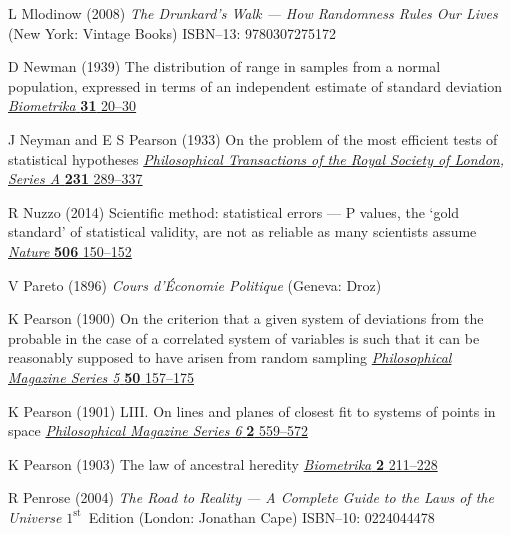 \begin{thebibliography}{99}
L Mlodinow
(2008) \textit{The Drunkard's Walk --- How Randomness Rules Our 
Lives}
(New York: Vintage Books)
ISBN--13: 9780307275172

D Newman
(1939) The distribution of range in samples from a normal 
population, expressed in terms of an independent estimate of 
standard deviation
\href{http://dx.doi.org/10.1093/biomet/31.1-2.20}{\textit{Biometrika}
\textbf{31} 20--30}

J Neyman and E S Pearson
(1933) On the problem of the most efficient tests of statistical 
hypotheses
\href{http://dx.doi.org/10.1098/rsta.1933.0009}{\textit{Philosophical Transactions of the Royal Society of London, 
Series A} \textbf{231} 289--337}

R Nuzzo
(2014) Scientific method: statistical errors --- P values, the 
`gold standard' of statistical validity, are not as reliable as 
many scientists assume
\href{https://doi.org/10.1038/506150a}{\textit{Nature} \textbf{506} 
150--152}

V Pareto
(1896) \textit{Cours d'\'{E}conomie Politique} (Geneva: Droz)

K Pearson
(1900) On the criterion that a given system of deviations from the 
probable in the case of a correlated system of variables is such 
that it can be reasonably supposed to have arisen from random 
sampling
\href{http://dx.doi.org/10.1080/14786440009463897}{\textit{Philosophical Magazine Series 5} \textbf{50} 157--175}

K Pearson
(1901) LIII. On lines and planes of closest fit to systems of 
points in space
\href{http://dx.doi.org/10.1080/14786440109462720}{\textit{Philosophical Magazine Series 6} \textbf{2} 559--572}

K Pearson
(1903) The law of ancestral heredity
\href{http://dx.doi.org/10.1093/biomet/2.2.211}{\textit{Biometrika} 
\textbf{2} 211--228}


R Penrose
(2004) \textit{The Road to Reality --- A Complete Guide to the Laws
of the Universe}
$1^{\text{st}}$~Edition (London: Jonathan Cape)
ISBN--10: 0224044478


\end{thebibliography}
